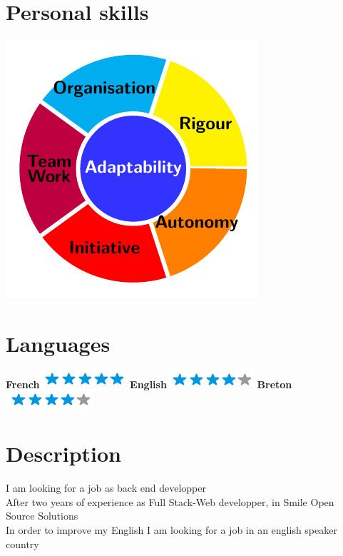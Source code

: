 \documentclass{friggeri-cv}
\begin{document}
\begin{aside}
	\section{Personal skills}
	\includegraphics[scale=0.70]{test.pdf}
	~
	\section{Languages}
	\textbf{French}\includegraphics[scale=0.40]{img/5stars.png}
	\textbf{English}\includegraphics[scale=0.40]{img/4stars.png}
	\textbf{Breton}\includegraphics[scale=0.40]{img/4stars.png}
\end{aside}

\section{Description}
\begin{entrylist}
	I am looking for a job as back end developper \\
	After two years of experience as Full Stack-Web developper, in Smile Open Source Solutions \\
	In order to improve my English I am looking for a job in an english speaker country \\	
\end{entrylist}
\end{document}
